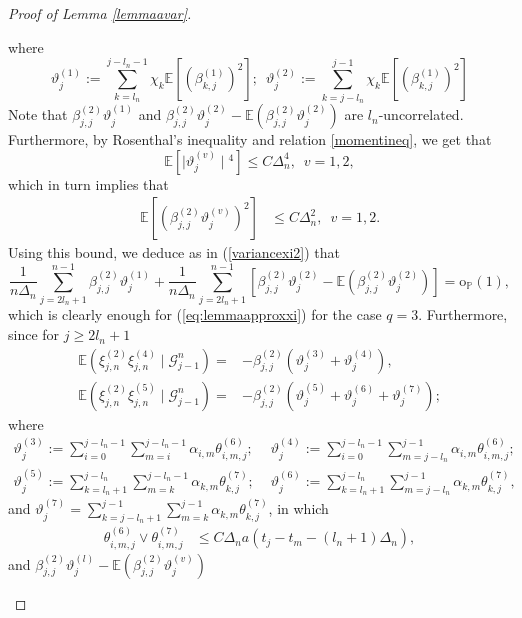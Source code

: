 \documentclass[10pt,a4paper]{amsart}
\begin{document}
\begin{proof}[Proof of Lemma \ref{lemmaavar}]
\begin{description}
		where 
		\[
		\vartheta_{j}^{(1)}:=\sum_{k=l_{n}}^{j-l_{n}-1}\chi_{k}\mathbb{E}[(\beta_{k,j}^{(1)})^{2}];\,\,\,\vartheta_{j}^{(2)}:=\sum_{k=j-l_{n}}^{j-1}\chi_{k}\mathbb{E}[(\beta_{k,j}^{(1)})^{2}]
		\]
		Note that $\beta_{j,j}^{(2)}\vartheta_{j}^{(1)}$ and $\beta_{j,j}^{(2)}\vartheta_{j}^{(2)}-\mathbb{E}(\beta_{j,j}^{(2)}\vartheta_{j}^{(2)})$
		are $l_{n}$-uncorrelated. Furthermore, by Rosenthal's inequality
		and relation \eqref{momentineq}, we get that 
		\[
		\mathbb{E}[\mid\vartheta_{j}^{(v)}\mid{}^{4}]\leq C\Delta_{n}^{4},\,\,\,v=1,2,
		\]
		which in turn implies that 
		\begin{align*}
			\mathbb{E}[(\beta_{j,j}^{(2)}\vartheta_{j}^{(v)})^{2}] & \leq C\Delta_{n}^{2},\,\,\,v=1,2.
		\end{align*}
		Using this bound, we deduce as in (\ref{variancexi2}) that 
		\[
		\frac{1}{n\Delta_{n}}\sum_{j=2l_{n}+1}^{n-1}\beta_{j,j}^{(2)}\vartheta_{j}^{(1)}+\frac{1}{n\Delta_{n}}\sum_{j=2l_{n}+1}^{n-1}\left[\beta_{j,j}^{(2)}\vartheta_{j}^{(2)}-\mathbb{E}(\beta_{j,j}^{(2)}\vartheta_{j}^{(2)})\right]=\mathrm{o}_{\mathbb{P}}(1),
		\]
		which is clearly enough for (\ref{eq:lemmaapproxxi}) for the case
		$q=3$. Furthermore, since for $j\geq2l_{n}+1$
		\begin{align*}
			\mathbb{E}(\xi_{j,n}^{(2)}\xi_{j,n}^{(4)}\mid\mathscr{G}_{j-1}^{n})= & -\beta_{j,j}^{(2)}(\vartheta_{j}^{(3)}+\vartheta_{j}^{(4)}),\\
			\mathbb{E}(\xi_{j,n}^{(2)}\xi_{j,n}^{(5)}\mid\mathscr{G}_{j-1}^{n})= & -\beta_{j,j}^{(2)}(\vartheta_{j}^{(5)}+\vartheta_{j}^{(6)}+\vartheta_{j}^{(7)});
		\end{align*}
		where 
		\begin{align*}
			\vartheta_{j}^{(3)}:=\sum_{i=0}^{j-l_{n}-1}\sum_{m=i}^{j-l_{n}-1}\alpha_{i,m}\theta_{i,m,j}^{(6)}; & \,\,\vartheta_{j}^{(4)}:=\sum_{i=0}^{j-l_{n}-1}\sum_{m=j-l_{n}}^{j-1}\alpha_{i,m}\theta_{i,m,j}^{(6)};\\
			\vartheta_{j}^{(5)}:=\sum_{k=l_{n}+1}^{j-l_{n}}\sum_{m=k}^{j-l_{n}-1}\alpha_{k,m}\theta_{k,j}^{(7)}; & \,\,\vartheta_{j}^{(6)}:=\sum_{k=l_{n}+1}^{j-l_{n}}\sum_{m=j-l_{n}}^{j-1}\alpha_{k,m}\theta_{k,j}^{(7)},
		\end{align*}
		and $\vartheta_{j}^{(7)}=\sum_{k=j-l_{n}+1}^{j-1}\sum_{m=k}^{j-1}\alpha_{k,m}\theta_{k,j}^{(7)}$,
		in which
		\begin{align*}
			\theta_{i,m,j}^{(6)}\lor\theta_{i,m,j}^{(7)} & \leq C\Delta_{n}a(t_{j}-t_{m}-(l_{n}+1)\Delta_{n}),
		\end{align*}
		and $\beta_{j,j}^{(2)}\vartheta_{j}^{(l)}-\mathbb{E}(\beta_{j,j}^{(2)}\vartheta_{j}^{(v)})$

\end{description}
\end{proof}
\end{document}
